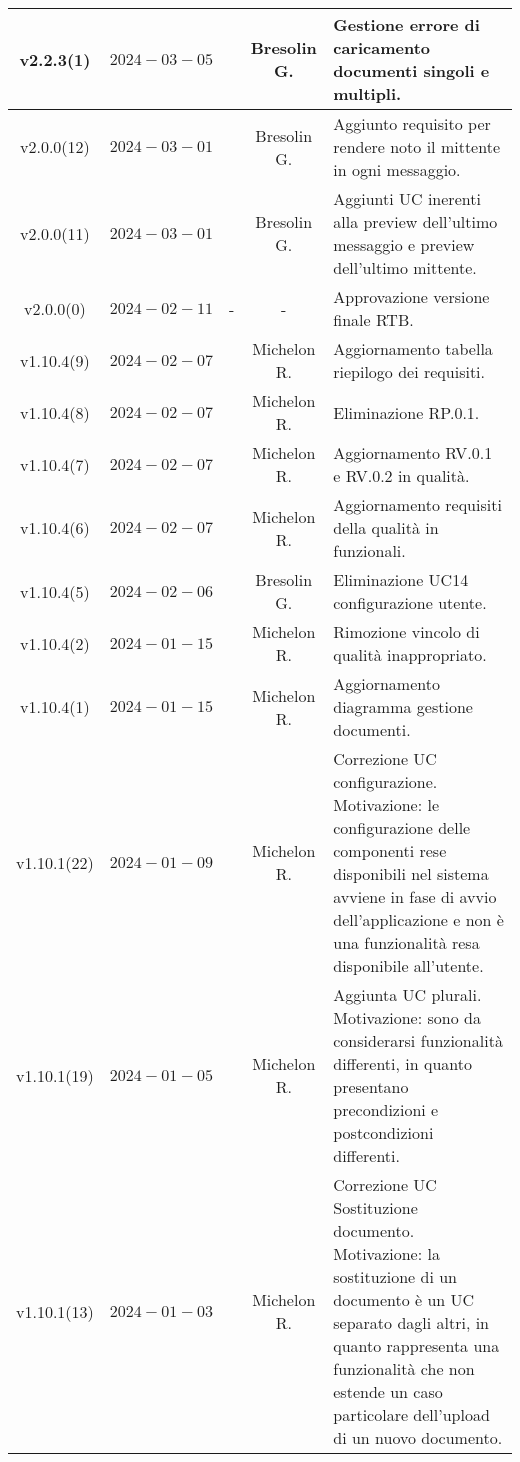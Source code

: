 {\begin{xltabular}{\textwidth}{c|c|c|c|X}
\hline
v2.2.3(1) & $2024-03-05$ &  & Bresolin G. & Gestione errore di caricamento documenti singoli e multipli.\\
\hline
v2.0.0(12) & $2024-03-01$ &  & Bresolin G. & Aggiunto requisito per rendere noto il mittente in ogni messaggio.\\
\hline
v2.0.0(11) & $2024-03-01$ &  & Bresolin G. & Aggiunti UC inerenti alla preview dell'ultimo messaggio e preview dell'ultimo mittente.\\
\hline
v2.0.0(0) & $2024-02-11$ & - & - & Approvazione versione finale RTB.\\
\hline
v1.10.4(9) & $2024-02-07$ &  & Michelon R. & Aggiornamento tabella riepilogo dei requisiti.\\
\hline
v1.10.4(8) & $2024-02-07$ &  & Michelon R. & Eliminazione RP.0.1.\\
\hline
v1.10.4(7) & $2024-02-07$ &  & Michelon R. & Aggiornamento RV.0.1 e RV.0.2 in qualità.\\
\hline
v1.10.4(6) & $2024-02-07$ &  & Michelon R. & Aggiornamento requisiti della qualità in funzionali.\\
\hline
v1.10.4(5) & $2024-02-06$ &  & Bresolin G. & Eliminazione UC14 configurazione utente.\\
\hline
v1.10.4(2) & $2024-01-15$ &  & Michelon R. & Rimozione vincolo di qualità inappropriato.\\
\hline
v1.10.4(1) & $2024-01-15$ &  & Michelon R. & Aggiornamento diagramma gestione documenti.\\
\hline
v1.10.1(22) & $2024-01-09$ &  & Michelon R. & Correzione UC configurazione. Motivazione: le configurazione delle componenti rese disponibili nel sistema avviene in fase di avvio dell'applicazione e non è una funzionalità resa disponibile all'utente.\\
\hline
v1.10.1(19) & $2024-01-05$ &  & Michelon R. & Aggiunta UC plurali. Motivazione: sono da considerarsi funzionalità differenti, in quanto presentano precondizioni e postcondizioni differenti.\\
\hline
v1.10.1(13) & $2024-01-03$ &  & Michelon R. & Correzione UC Sostituzione documento. Motivazione: la sostituzione di un documento è un UC separato dagli altri, in quanto rappresenta una funzionalità che non estende un caso particolare dell'upload di un nuovo documento.\\

\end{xltabular}}
